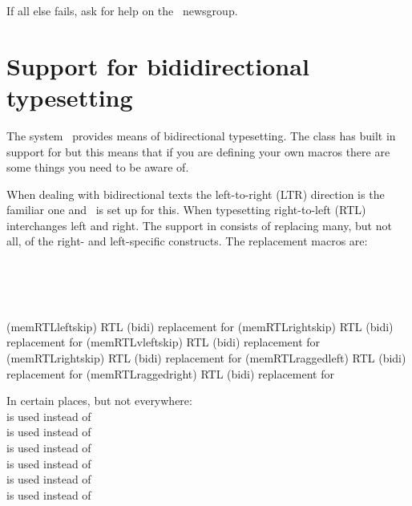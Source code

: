     If all else fails, ask for help on the \pixctt\ newsgroup.

\section{Support for bididirectional typesetting}

    The  system~\cite{BIDI} provides means of bidirectional 
typesetting. The class has built in support for  but this means 
that if you are defining your own macros there are some things you need 
to be aware of.

    When dealing with bidirectional texts the left-to-right 
(LTR) direction
is the familiar one and \ltx\ is set up for this. When typesetting
right-to-left (RTL)  interchanges left and right. 
The support in  consists of replacing many, but not all, of 
the right- and left-specific constructs. The replacement macros are:

\begin{syntax}
\cmd{\memRTLleftskip} \cmd{\memRTLrightskip} \\
\cmd{\memRTLvleftskip} \cmd{\memRTLvrightskip} \\
\cmd{\memRTLraggedright} \cmd{\memRTLraggedleft} \\
\end{syntax}
\glossary(memRTLleftskip)%
  {}%
  {RTL (bidi) replacement for }
\glossary(memRTLrightskip)%
  {}%
  {RTL (bidi) replacement for }
\glossary(memRTLvleftskip)%
  {}%
  {RTL (bidi) replacement for }
\glossary(memRTLrightskip)%
  {}%
  {RTL (bidi) replacement for }
\glossary(memRTLraggedleft)%
  {}%
  {RTL (bidi) replacement for }
\glossary(memRTLraggedright)%
  {}%
  {RTL (bidi) replacement for }

    In certain places, but not everywhere: \\
\cmd{\memRTLleftskip} is used instead of \cmd{\leftskip} \\
\cmd{\memRTLrightskip} is used instead of \cmd{\rightskip} \\
\cmd{\memRTLvleftskip} is used instead of \cmd{\vleftskip} \\
\cmd{\memRTLvrightskip} is used instead of \cmd{\vrightskip} \\
\cmd{\memRTLraggedleft} is used instead of \cmd{\raggedleft} \\
\cmd{\memRTLraggedright} is used instead of \cmd{\raggedright} \\


